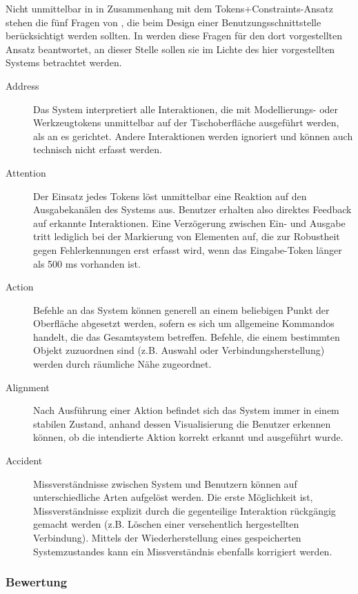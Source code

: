 Nicht unmittelbar in in Zusammenhang mit dem Tokens+Constraints-Ansatz stehen die fünf Fragen von \citep{Bellotti02}, die beim Design einer Benutzungsschnittstelle berücksichtigt werden sollten. In \citet{Ullmer05} werden diese Fragen für den dort vorgestellten Ansatz beantwortet, an dieser Stelle sollen sie im Lichte des hier vorgestellten Systems betrachtet werden.

\begin{description}
	\item[Address] Das System interpretiert alle Interaktionen, die mit Modellierungs- oder Werkzeugtokens unmittelbar auf der Tischoberfläche ausgeführt werden, als an es gerichtet. Andere Interaktionen werden ignoriert und können auch technisch nicht erfasst werden.
	\item[Attention] Der Einsatz jedes Tokens löst unmittelbar eine Reaktion auf den Ausgabekanälen des Systems aus. Benutzer erhalten also direktes Feedback auf erkannte Interaktionen. Eine Verzögerung zwischen Ein- und Ausgabe tritt lediglich bei der Markierung von Elementen auf, die zur Robustheit gegen Fehlerkennungen erst erfasst wird, wenn das  Eingabe-Token länger als 500 ms vorhanden ist.
	\item[Action] Befehle an das System können generell an einem beliebigen Punkt der Oberfläche abgesetzt werden, sofern es sich um allgemeine Kommandos handelt, die das Gesamtsystem betreffen. Befehle, die einem bestimmten Objekt zuzuordnen sind (z.B. Auswahl oder Verbindungsherstellung) werden durch räumliche Nähe zugeordnet.
	\item[Alignment] Nach Ausführung einer Aktion befindet sich das System immer in einem stabilen Zustand, anhand dessen Visualisierung die Benutzer erkennen können, ob die intendierte Aktion korrekt erkannt und ausgeführt wurde.
	\item[Accident] Missverständnisse zwischen System und Benutzern können auf unterschiedliche Arten aufgelöst werden. Die erste Möglichkeit ist, Missverständnisse explizit durch die gegenteilige Interaktion rückgängig gemacht werden (z.B. Löschen einer versehentlich hergestellten Verbindung). Mittels der Wiederherstellung eines gespeicherten Systemzustandes kann ein Missverständnis ebenfalls korrigiert werden.
\end{description}

\subsubsection{Bewertung}

